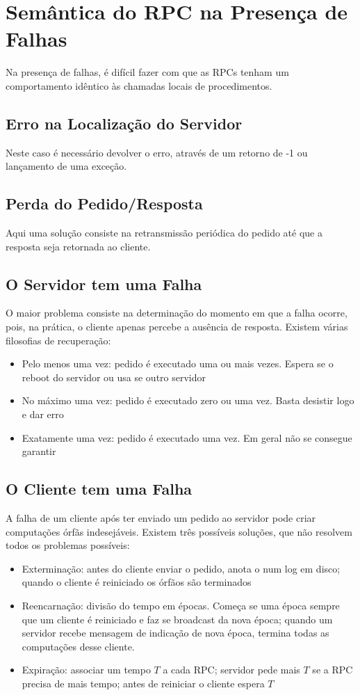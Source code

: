\documentclass[10pt,a4paper]{report}
\begin{document}
\section{Semântica do RPC na Presença de Falhas}
Na presença de falhas, é difícil fazer com que as RPCs tenham um comportamento idêntico às chamadas locais de procedimentos.
\subsection{Erro na Localização do Servidor}
Neste caso é necessário devolver o erro, através de um retorno de -1 ou lançamento de uma exceção.
\subsection{Perda do Pedido/Resposta}
Aqui uma solução consiste na retransmissão periódica do pedido até que a resposta seja retornada ao cliente.
\subsection{O Servidor tem uma Falha}
O maior problema consiste na determinação do momento em que a falha ocorre, pois, na prática, o cliente apenas percebe a ausência de resposta. Existem várias filosofias de recuperação:
\begin{itemize}
\item Pelo menos uma vez: pedido é executado uma ou mais vezes. Espera
se o reboot do servidor ou usa se outro servidor
\item No máximo uma vez: pedido é executado zero ou uma vez. Basta desistir logo e dar erro
\item Exatamente uma vez: pedido é executado uma vez. Em geral não se consegue garantir
\end{itemize}
\subsection{O Cliente tem uma Falha}
A falha de um cliente após ter enviado um pedido ao servidor pode criar computações órfãs indesejáveis. Existem três possíveis soluções, que não resolvem todos os problemas possíveis:
\begin{itemize}
\item Exterminação: antes do cliente enviar o pedido, anota o num log em disco; quando o cliente é reiniciado os órfãos são terminados
\item Reencarnação: divisão do tempo em épocas. Começa se uma época sempre que um cliente é reiniciado e faz se broadcast da nova época; quando um servidor recebe mensagem de indicação de nova época, termina todas as computações desse cliente.
\item Expiração: associar um tempo $T$ a cada RPC; servidor pede mais $T$ se a RPC precisa de mais tempo; antes de reiniciar o cliente espera $T$
\end{itemize}
\end{document}

